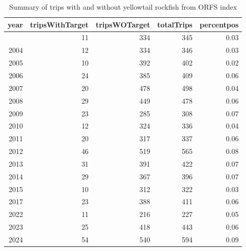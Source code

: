 \documentclass[
]{scrartcl}
\begin{document}
\begin{longtable}{rrrrrrrrrr}
\end{longtable}

\endgroup

\newpage{}

\begingroup
\fontsize{9.0pt}{10.8pt}\selectfont

\begin{longtable}{rrrrr}

\caption{\label{tbl-yelloweye_percent_pos_ORFS}Summary of trips with and
without yellowtail rockfish from ORFS index}

\tabularnewline

\toprule
year & tripsWithTarget & tripsWOTarget & totalTrips & percentpos \\ 
\midrule\addlinespace[2.5pt]
2001 & 11 & 334 & 345 & 0.03 \\ 
2004 & 12 & 334 & 346 & 0.03 \\ 
2005 & 10 & 392 & 402 & 0.02 \\ 
2006 & 24 & 385 & 409 & 0.06 \\ 
2007 & 20 & 478 & 498 & 0.04 \\ 
2008 & 29 & 449 & 478 & 0.06 \\ 
2009 & 23 & 285 & 308 & 0.07 \\ 
2010 & 12 & 324 & 336 & 0.04 \\ 
2011 & 20 & 317 & 337 & 0.06 \\ 
2012 & 46 & 519 & 565 & 0.08 \\ 
2013 & 31 & 391 & 422 & 0.07 \\ 
2014 & 29 & 367 & 396 & 0.07 \\ 
2015 & 10 & 312 & 322 & 0.03 \\ 
2017 & 23 & 388 & 411 & 0.06 \\ 
2022 & 11 & 216 & 227 & 0.05 \\ 
2023 & 25 & 418 & 443 & 0.06 \\ 
2024 & 54 & 540 & 594 & 0.09 \\ 
\bottomrule

\end{longtable}

\endgroup

\newpage{}

\begingroup
\fontsize{9.0pt}{10.8pt}\selectfont
\end{document}
